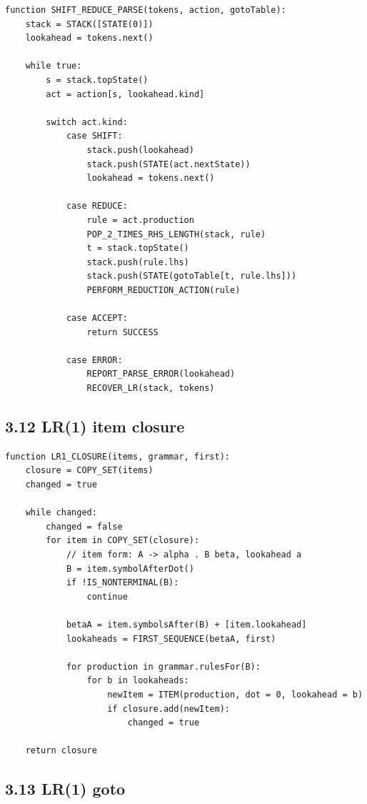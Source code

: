\documentclass[10pt,letterpaper]{article}
\begin{document}
\begin{verbatim}
function SHIFT_REDUCE_PARSE(tokens, action, gotoTable):
    stack = STACK([STATE(0)])
    lookahead = tokens.next()

    while true:
        s = stack.topState()
        act = action[s, lookahead.kind]

        switch act.kind:
            case SHIFT:
                stack.push(lookahead)
                stack.push(STATE(act.nextState))
                lookahead = tokens.next()

            case REDUCE:
                rule = act.production
                POP_2_TIMES_RHS_LENGTH(stack, rule)
                t = stack.topState()
                stack.push(rule.lhs)
                stack.push(STATE(gotoTable[t, rule.lhs]))
                PERFORM_REDUCTION_ACTION(rule)

            case ACCEPT:
                return SUCCESS

            case ERROR:
                REPORT_PARSE_ERROR(lookahead)
                RECOVER_LR(stack, tokens)
\end{verbatim}

\subsection*{3.12 LR(1) item closure}

\begin{verbatim}
function LR1_CLOSURE(items, grammar, first):
    closure = COPY_SET(items)
    changed = true

    while changed:
        changed = false
        for item in COPY_SET(closure):
            // item form: A -> alpha . B beta, lookahead a
            B = item.symbolAfterDot()
            if !IS_NONTERMINAL(B):
                continue

            betaA = item.symbolsAfter(B) + [item.lookahead]
            lookaheads = FIRST_SEQUENCE(betaA, first)

            for production in grammar.rulesFor(B):
                for b in lookaheads:
                    newItem = ITEM(production, dot = 0, lookahead = b)
                    if closure.add(newItem):
                        changed = true

    return closure
\end{verbatim}

\subsection*{3.13 LR(1) goto}
\end{document}
